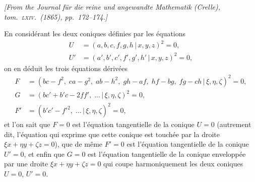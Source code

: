 \documentclass[11pt,a4paper]{article}
\providecommand{\mid}{\,|\,}
\begin{document}
\begin{otherlanguage}{french}

\noindent\textit{[From the \textit{Journal f\"ur die reine und angewandte Mathematik} (Crelle), tom.~\textsc{lxiv}.\ (1865), pp.~172--174.]}

\medskip

En consid\'erant les deux coniques d\'efinies par les \'equations
\[
\begin{aligned}
U &= (a, b, c, f, g, h \mid x, y, z)^{2} = 0,\\
U' &= (a', b', c', f', g', h' \mid x, y, z)^{2} = 0,
\end{aligned}
\]
on en d\'eduit les trois \'equations d\'eriv\'ees
\[
\begin{aligned}
F &= (bc - f^{2},\; ca - g^{2},\; ab - h^{2},\; gh - af,\; hf - bg,\; fg - ch \mid \xi, \eta, \zeta)^{2} = 0,\\
G &= (bc' + b'c - 2ff',\; \ldots \mid \xi, \eta, \zeta)^{2} = 0,\\
F' &= (b'c' - f'^{2},\; \ldots \mid \xi, \eta, \zeta)^{2} = 0,
\end{aligned}
\]
et l'on sait que $F = 0$ est l'\'equation tangentielle de la conique $U = 0$ (autrement dit, l'\'equation qui exprime que cette conique est touch\'ee par la droite $\xi x + \eta y + \zeta z = 0$), que de m\^eme $F' = 0$ est l'\'equation tangentielle de la conique $U' = 0$, et enfin que $G = 0$ est l'\'equation tangentielle de la conique envelopp\'ee par une droite $\xi x + \eta y + \zeta z = 0$ qui coupe harmoniquement les deux coniques $U = 0$, $U' = 0$.


\end{otherlanguage}
\end{document}
